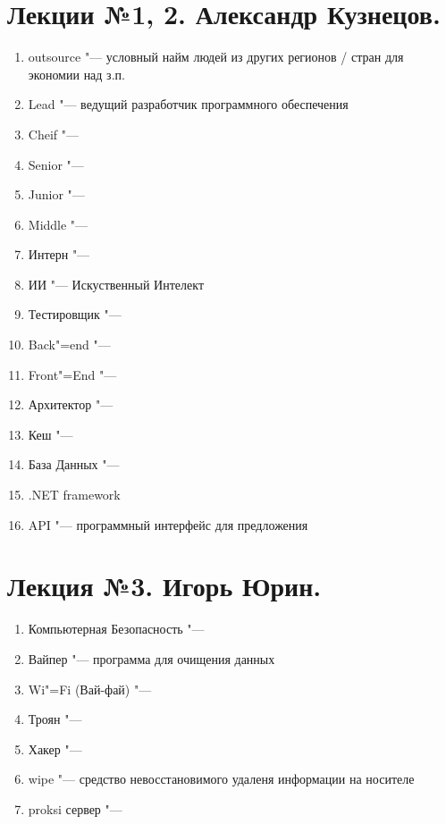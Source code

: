 \documentclass{article}
\begin{document}
\section{Лекции №1, 2. Александр Кузнецов.}
\begin{enumerate}
    \item outsource "--- условный найм людей из других регионов / стран для экономии над з.п.
    \item Lead "--- ведущий разработчик программного обеспечения
    \item Cheif "---
    \item Senior "---
    \item Junior "---
    \item Middle "---
    \item Интерн "---
    \item ИИ "--- Искуственный Интелект
    \item Тестировщик "---
    \item Back"=end "---
    \item Front"=End "---
    \item Архитектор "---
    \item Кеш "---
    \item База Данных "---
    \item .NET framework
    \item API "--- программный интерфейс для предложения
\end{enumerate}

\section{Лекция №3. Игорь Юрин.}
\begin{enumerate}
    \item Компьютерная Безопасность "---
    \item Вайпер "--- программа для очищения данных
    \item Wi"=Fi (Вай-фай) "---
    \item Троян "---
    \item Хакер "---
    \item wipe "--- средство невосстановимого удаленя информации на носителе
    \item proksi сервер "---
\end{enumerate}
\end{document}
